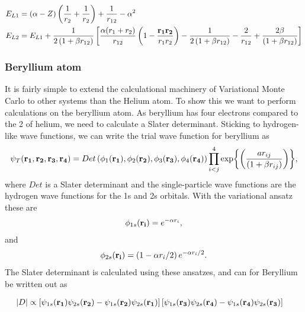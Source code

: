 		\begin{align}
			E_{L1} &= (\alpha - Z)\left( \frac{1}{r_2} + \frac{1}{r_2} \right) + \frac{1}{r_{12}} - \alpha ^2
			\\
			E_{L2} &= E_{L1} + \frac{1}{2\left(1+\beta r_{12}\right)} \left[ \frac{\alpha(r_1 + r_2)}{r_{12}}\left( 1 - \frac{\vb{r_1}\vb{r_2}}{r_1 r_2} \right)  -  \frac{1}{2\left(1+\beta r_{12}\right)} - \frac{2}{r_{12}} +  \frac{2\beta}{\left(1+\beta r_{12}\right)} \right]
		\end{align}


	\subsubsection{Beryllium atom}

		It is fairly simple to extend the calculational machinery of Variational
		Monte Carlo to other systems than the Helium atom. To show this we
		want to perform calculations on the beryllium atom. As beryllium has
		four electrons compared to the 2 of helium, we need to calculate a
		Slater determinant. Sticking to hydrogen-like wave functions,
		we can write the trial wave function for beryllium as
		\begin{equation}
			\psi_{T}({\bf r_{1}},{\bf r_{2}},{\bf r_{3}},{\bf r_{4}})=Det\left(\phi_{1}({\bf r_{1}}),\phi_{2}({\bf r_{2}}),\phi_{3}({\bf r_{3}}),\phi_{4}({\bf r_{4}})\right)\prod_{i<j}^{4}\exp{\left(\frac{a r_{ij}}{(1+\beta r_{ij})}\right)},
			\label{eq:BerylliumTrialFunction}
		\end{equation}
		where $Det$ is a Slater determinant and the single-particle wave
		functions are the hydrogen wave functions for the 1s and 2s orbitals.
		With the variational ansatz these are
		\begin{align}
			\phi_{1s}({\bf r_{i}})=e^{-\alpha r_{i}},
		\end{align}
		and
		\begin{align}
			\phi_{2s}({\bf r_{i}})=\left(1-\alpha r_{i}/2\right)e^{-\alpha r_{i}/2}.
		\end{align}
		The Slater determinant is calculated using these ansatzes, and can for Beryllium be written out as

		\begin{align}
			|D| &\propto 
			\left[ \psi_{1s}(\vb{r_1})\psi_{2s}(\vb{r_2}) -   \psi_{1s}(\vb{r_2})\psi_{2s}(\vb{r_1})  \right]
			\left[ \psi_{1s}(\vb{r_3})\psi_{2s}(\vb{r_4}) -   \psi_{1s}(\vb{r_4})\psi_{2s}(\vb{r_3})  
			\right]
		\end{align}


